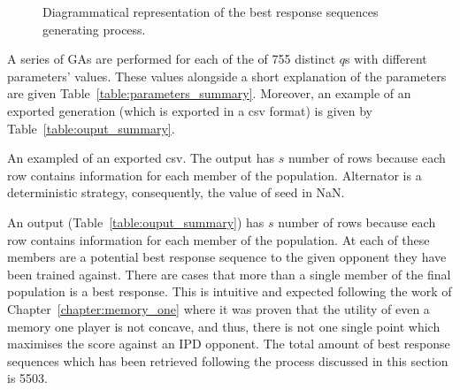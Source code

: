 \begin{figure}[!htbp]
    \centering
    
    \caption{Diagrammatical representation of the best response
    sequences generating process.}\label{fig:data_generating_process_diagram}
\end{figure}

A series of GAs are performed for each of the of 755 distinct \(q\)s with
different parameters' values. These values alongside a short explanation of the
parameters are given Table~\ref{table:parameters_summary}. Moreover,
an example of an exported generation (which is exported in a csv format)
is given by Table~\ref{table:ouput_summary}.

\begin{table}[!htbp]
    \begin{center}
    \end{center}
    \caption{The parameters of the genetic algorithm.}\label{table:parameters_summary}
\end{table}

\begin{table}[!htbp]
    \resizebox{\textwidth}{!}{
    }
    \caption{An exampled of an exported csv. The output has \(s\) number of rows because
    each row contains information for each member of the population. Alternator is
    a deterministic strategy, consequently,
    the value of seed in NaN.}\label{table:ouput_summary}
\end{table}

An output (Table~\ref{table:ouput_summary}) has \(s\) number of rows because
each row contains information for each member of the population. At each of these
members are a potential best response sequence to the given opponent they have
been trained against. There are cases that more than a single member of the
final population is a best response. This is intuitive and expected following the
work of Chapter~\ref{chapter:memory_one} where it was proven that the utility
of even a memory one player is not concave, and thus, there is not one single
point which maximises the score against an IPD opponent. The total amount
of best response sequences which has been retrieved following the process
discussed in this section is 5503.

